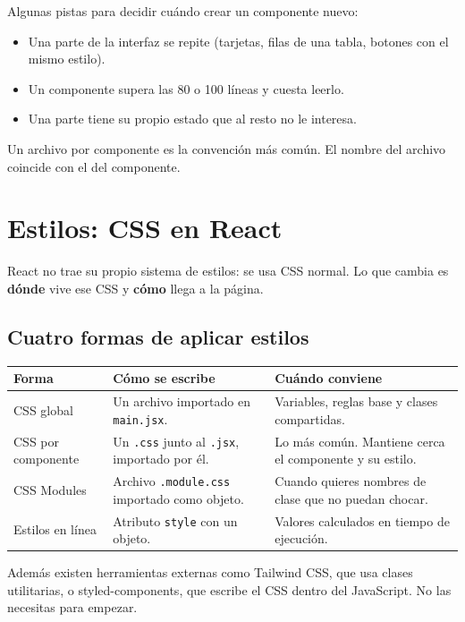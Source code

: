 \documentclass[11pt,a4paper]{article}
\newcommand{\cmd}[1]{\texttt{\color{reactdark}#1}}
\begin{document}
Algunas pistas para decidir cuándo crear un componente nuevo:
\begin{itemize}
  \item Una parte de la interfaz se repite (tarjetas, filas de una tabla, botones con el mismo estilo).
  \item Un componente supera las 80 o 100 líneas y cuesta leerlo.
  \item Una parte tiene su propio estado que al resto no le interesa.
\end{itemize}
Un archivo por componente es la convención más común. El nombre del archivo coincide con el del componente.

\section{Estilos: CSS en React}\label{sec:css}

React no trae su propio sistema de estilos: se usa CSS normal. Lo que cambia es \textbf{dónde} vive ese CSS y \textbf{cómo} llega a la página.

\subsection{Cuatro formas de aplicar estilos}

\begin{center}
\small
\begin{tabular}{p{3.1cm} p{4.6cm} p{5.6cm}}
\toprule
\textbf{Forma} & \textbf{Cómo se escribe} & \textbf{Cuándo conviene} \\
\midrule
CSS global & Un archivo importado en \cmd{main.jsx}. & Variables, reglas base y clases compartidas. \\
\addlinespace
CSS por componente & Un \cmd{.css} junto al \cmd{.jsx}, importado por él. & Lo más común. Mantiene cerca el componente y su estilo. \\
\addlinespace
CSS Modules & Archivo \cmd{.module.css} importado como objeto. & Cuando quieres nombres de clase que no puedan chocar. \\
\addlinespace
Estilos en línea & Atributo \cmd{style} con un objeto. & Valores calculados en tiempo de ejecución. \\
\bottomrule
\end{tabular}
\end{center}

Además existen herramientas externas como Tailwind CSS, que usa clases utilitarias, o styled-components, que escribe el CSS dentro del JavaScript. No las necesitas para empezar.
\end{document}
